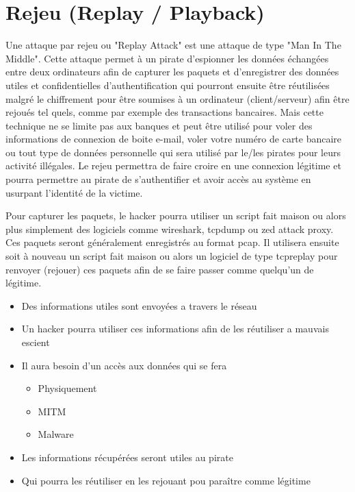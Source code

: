 

\newpage
\section{Rejeu (Replay / Playback)}\label{vulnerabilites:reseau:replay}

Une attaque par rejeu ou "Replay Attack" est une attaque de type "Man In The Middle". Cette attaque permet à un pirate d'espionner les données échangées entre deux ordinateurs afin de capturer les paquets et d'enregistrer des données utiles et confidentielles d'authentification qui pourront ensuite être réutilisées malgré le chiffrement pour être soumises à un ordinateur (client/serveur) afin être rejoués tel quels, comme par exemple des transactions bancaires. Mais cette technique ne se limite pas aux banques et peut être utilisé pour voler des informations de connexion de boite e-mail, voler votre numéro de carte bancaire ou tout type de données personnelle qui sera utilisé par le/les pirates pour leurs activité illégales. Le rejeu permettra de faire croire en une connexion légitime et pourra permettre au pirate de s'authentifier et avoir accès au système en usurpant l'identité de la victime. 

\begin{flushleft}
Pour capturer les paquets, le hacker pourra utiliser un script fait maison ou alors plus simplement des logiciels comme wireshark, tcpdump ou zed attack proxy. Ces paquets seront généralement enregistrés au format pcap. Il utilisera ensuite soit à nouveau un script fait maison ou alors un logiciel de type tcpreplay pour renvoyer (rejouer) ces paquets afin de se faire passer comme quelqu'un de légitime.
\end{flushleft}

\bigskip

\begin{itemize}
\item Des informations utiles sont envoyées a travers le réseau
\item Un hacker pourra utiliser ces informations afin de les réutiliser a mauvais escient
\item Il aura besoin d'un accès aux données qui se fera
\begin{itemize}
\item Physiquement
\item MITM 
\item Malware
\end{itemize}
\item Les informations récupérées seront utiles au pirate
\item Qui pourra les réutiliser en les rejouant pou paraître comme légitime
\end{itemize}


